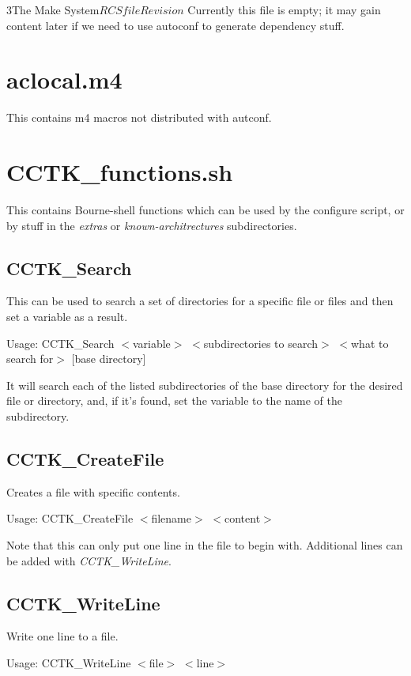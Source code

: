 \begin{cactuspart}{3}{The Make System}{$RCSfile$}{$Revision$}
Currently this file is empty;  it may gain content later if we need to
use autoconf to generate dependency stuff.

\section{aclocal.m4}
\label{sec:autoconf:aclocal}

This contains m4 macros not distributed with autconf.

\section{CCTK\_functions.sh}
\label{sec:autoconf:functions}

This contains Bourne-shell functions which can be used by 
the configure script, or by stuff in the {\em extras} or 
{\em known-architrectures} subdirectories.

\subsection{CCTK\_Search}

This can be used to search a set of directories for a specific file
or files and then set a variable as a result.

Usage: CCTK\_Search $<$variable$>$ $<$subdirectories to search$>$ $<$what to search for$>$ [base directory]

It will search each of the listed subdirectories of the base directory for the desired
file or directory, and, if it's found, set the variable to the name of the subdirectory.

\subsection{CCTK\_CreateFile}

Creates a file with specific contents.

Usage: CCTK\_CreateFile $<$filename$>$ $<$content$>$ 

Note that this can only put one line in the file to begin with.  Additional
lines can be added with {\em CCTK\_WriteLine}.

\subsection{CCTK\_WriteLine}

Write one line to a file.

Usage: CCTK\_WriteLine $<$file$>$ $<$line$>$


\end{cactuspart}
